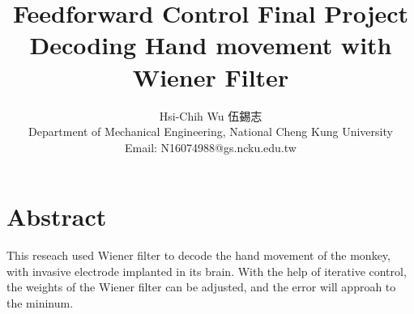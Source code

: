 \documentclass[8pt,a4paper]{article}
\begin{document}
\title{ \bf{ Feedforward Control Final Project \\  Decoding Hand movement with Wiener Filter }}
\author{ Hsi-Chih Wu 伍錫志 \\ Department of Mechanical Engineering, National Cheng Kung University \\ Email: N16074988@gs.ncku.edu.tw  }
\date{}

\maketitle

\section*{Abstract}

This reseach used Wiener filter to decode the hand movement of the monkey, with invasive electrode implanted in its brain. 
With the help of iterative control, the weights of the Wiener filter can be adjusted, and the error will approah to the mininum.
\end{document}
